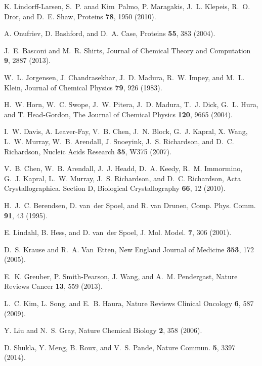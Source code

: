 \documentclass[aps,prl,preprint,nofootinbib,superscriptaddress,linenumbers]{revtex4-1}
\begin{document}
\begin{thebibliography}{100}
K. Lindorff-Larsen, S.~P. anad Kim~Palmo, P. Maragakis, J.~L. Klepeis, R.~O.
  Dror, and D.~E. Shaw, Proteins {\bf 78},  1950  (2010).

A. Onufriev, D. Bashford, and D.~A. Case, Proteins {\bf 55},  383  (2004).

J.~E. Basconi and M.~R. Shirts, Journal of Chemical Theory and Computation {\bf
  9},  2887  (2013).

W.~L. Jorgensen, J. Chandrasekhar, J.~D. Madura, R.~W. Impey, and M.~L. Klein,
  Journal of Chemical Physics {\bf 79},  926  (1983).

H.~W. Horn, W.~C. Swope, J.~W. Pitera, J.~D. Madura, T.~J. Dick, G.~L. Hura,
  and T. Head-Gordon, The Journal of Chemical Physics {\bf 120},  9665  (2004).

I.~W. Davis, A. Leaver-Fay, V.~B. Chen, J.~N. Block, G.~J. Kapral, X. Wang,
  L.~W. Murray, W.~B. Arendall, J. Snoeyink, J.~S. Richardson, and D.~C.
  Richardson, Nucleic Acids Research {\bf 35},  W375  (2007).

V.~B. Chen, W.~B. Arendall, J.~J. Headd, D.~A. Keedy, R.~M. Immormino, G.~J.
  Kapral, L.~W. Murray, J.~S. Richardson, and D.~C. Richardson, Acta
  Crystallographica. Section D, Biological Crystallography {\bf 66},  12
  (2010).

H.~J.~C. Berendsen, D. van~der Spoel, and R. van Drunen, Comp. Phys. Comm. {\bf
  91},  43  (1995).

E. Lindahl, B. Hess, and D. van~der Spoel, J. Mol. Model. {\bf 7},  306
  (2001).

D.~S. Krause and R.~A. Van~Etten, New England Journal of Medicine {\bf 353},
  172  (2005).

E.~K. Greuber, P. Smith-Pearson, J. Wang, and A.~M. Pendergast, Nature Reviews
  Cancer {\bf 13},  559  (2013).

L.~C. Kim, L. Song, and E.~B. Haura, Nature Reviews Clinical Oncology {\bf 6},
  587  (2009).

Y. Liu and N.~S. Gray, Nature Chemical Biology {\bf 2},  358  (2006).

D. Shukla, Y. Meng, B. Roux, and V.~S. Pande, Nature Commun. {\bf 5},  3397
  (2014).


\end{thebibliography}
\end{document}
